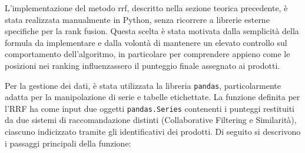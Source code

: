 L'implementazione del metodo \gls{rrf}, descritto nella sezione teorica precedente, è stata realizzata manualmente in Python, senza ricorrere a librerie esterne specifiche per la rank fusion. Questa scelta è stata motivata dalla semplicità della formula da implementare e dalla volontà di mantenere un elevato controllo sul comportamento dell'algoritmo, in particolare per comprendere appieno come le posizioni nei ranking influenzassero il punteggio finale assegnato ai prodotti.

Per la gestione dei dati, è stata utilizzata la libreria \texttt{pandas}, particolarmente adatta per la manipolazione di serie e tabelle etichettate. La funzione definita per l'RRF ha come input due oggetti \texttt{pandas.Series} contenenti i punteggi restituiti da due sistemi di raccomandazione distinti (Collaborative Filtering e Similarità), ciascuno indicizzato tramite gli identificativi dei prodotti. Di seguito si descrivono i passaggi principali della funzione:

